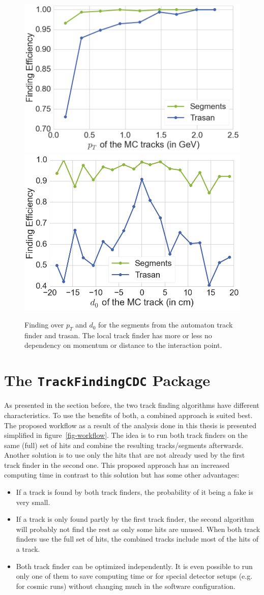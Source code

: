 \begin{figure}
  \centering
  \includegraphics[width=0.48\linewidth]{figures/workflow/segments_pt.png}
  \includegraphics[width=0.48\linewidth]{figures/workflow/segments_d0.png}
  \caption{Finding over $p_T$ and $d_0$ for the segments from the automaton track finder and trasan. The local track finder has more or less no dependency on momentum or distance to the interaction point.}
  \label{fig-segments-efficiency}
\end{figure}

\section{The \texttt{TrackFindingCDC} Package}
As presented in the section before, the two track finding algorithms have different characteristics. To use the benefits of both, a combined approach is suited best. The proposed workflow as a result of the analysis done in this thesis is presented simplified in figure~\ref{fig-workflow}. The idea is to run both track finders on the same (full) set of hits and combine the resulting tracks/segments afterwards. Another solution is to use only the hits that are not already used by the first track finder in the second one. This proposed approach has an increased computing time in contrast to this solution but has some other advantages: 
\begin{itemize}
 \item If a track is found by both track finders, the probability of it being a fake is very small.
 \item If a track is only found partly by the first track finder, the second algorithm will probably not find the rest as only some hits are unused. When both track finders use the full set of hits, the combined tracks include most of the hits of a track.
 \item Both track finder can be optimized independently. It is even possible to run only one of them to save computing time or for special detector setups (e.g. for cosmic runs) without changing much in the software configuration.
\end{itemize}

